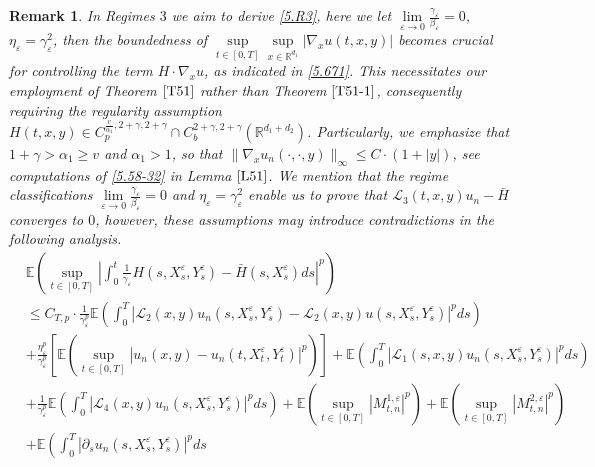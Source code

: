 \documentclass[11pt,reqno]{amsart}
\newtheorem{remark}{\indent Remark}[section]
\numberwithin{equation}{section}
\begin{document}
\begin{remark}
	In Regimes $3$ we aim to derive \eqref{5.R3}, here we let $ \lim\limits_{\varepsilon \rightarrow0}\frac{\gamma_{\varepsilon}}{\beta_{\varepsilon} }=0$,  $\eta_{\varepsilon}=\gamma_{\varepsilon}^{2}$, then the  boundedness of $	\underset{t\in [0,T]}{\sup}\underset{ x\in \mathbb{R}^{d_{1}}}{\sup}|\nabla_{x}u(t,x,y)|$ becomes crucial for controlling the term $H\cdot\nabla_{x} u$, as indicated in \eqref{5.671}. This necessitates our employment of Theorem $\ref{T51}$ rather than Theorem $\ref{T51-1}$, consequently requiring the regularity assumption  $H(t,x,y)\in C_{p}^{\frac{v}{\alpha_{1}},2+\gamma,2+\gamma}\cap C_{b}^{2+\gamma,2+\gamma}(\mathbb{R}^{d_{1}+d_{2}})$. Particularly, we emphasize that $1+\gamma>\alpha_{1}\geq v$ and $\alpha_{1}>1$,  so that $\|\nabla_{x}u_ {n}(\cdot,\cdot,y)\|_{\infty}\leq C\cdot (1+|y|)$, see computations of \eqref{5.58-32} in Lemma $\ref{L51}$. We mention that the regime classifications  $ \lim\limits_{\varepsilon \rightarrow0}\frac{\gamma_{\varepsilon}}{\beta_{\varepsilon} }=0$ and $\eta_{\varepsilon}=\gamma_{\varepsilon}^{2}$ enable us to prove that  $\mathcal{L}_{3}(t,x,y)u_{n}-\bar{H}$ converges to $0$,   however, these assumptions may introduce contradictions in the following analysis.
\begin{align}
&\mathbb{E}\left( \sup_{t\in [0,T]}\left| \int_{0}^{t} \frac{1}{\gamma_{\varepsilon}}H(s,X_{s}^{\varepsilon},Y_{s}^{\varepsilon})- \bar{H}(s,X_{s}^{\varepsilon})ds\right|^{p} \right)\nonumber \\
&\leq C_{T,p}\cdot\frac{1}{\gamma_{\varepsilon}^{p}} \mathbb{E}\left( \int_{0}^{T}| \mathcal{L}_{2}(x,y)u_{n}(s,X_{s}^{\varepsilon},Y_{s}^{\varepsilon})-\mathcal{L}_{2}(x,y)u(s,X_{s}^{\varepsilon},Y_{s}^{\varepsilon})|^{p} ds\right) \nonumber \\
&+  \frac{\eta_{\varepsilon}^{p}}{\gamma_{\varepsilon}^{p}}\left[ \mathbb{E}\left( \sup_{t\in [0,T]}|u_{n}(x,y)-u_{n}(t,X_{t}^{\varepsilon},Y_{t}^{\varepsilon})|^{p}\right)\right] +\mathbb{E}\left( \int_{0}^{T}|\mathcal{L}_{1}(s,x,y)u_{n}(s,X_{s}^{\varepsilon},Y_{s}^{\varepsilon})|^{p}ds\right)\nonumber	\\
&+\frac{1}{\gamma_{\varepsilon}^{p}}\mathbb{E}\left( \int_{0}^{T}|\mathcal{L}_{4}(x,y)u_{n}(s,X_{s}^{\varepsilon},Y_{s}^{\varepsilon})|^{p}ds\right)+\mathbb{E}\left( \sup_{t\in [0,T]}|M_{t,n}^{1,\varepsilon}|^{p}\right)+\mathbb{E}\left( \sup_{t\in [0,T]}|M_{t,n}^{2,\varepsilon}|^{p}\right)\nonumber	\\
&
 +  \mathbb{E}\left(  \int_{0}^{T}\left|\partial_{s}u_{n}(s,X_{s}^{\varepsilon},Y_{s}^{\varepsilon})\right|^{p} ds

\end{align}
\end{remark}
\end{document}

